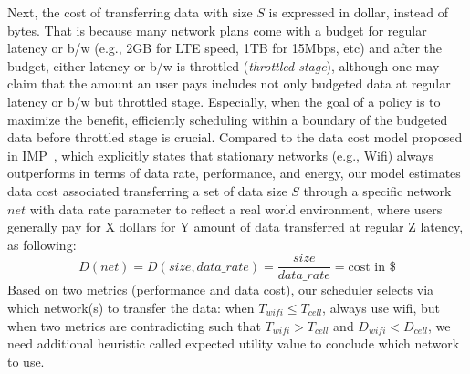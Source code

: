 \documentclass[12pt]{article}
\begin{document}
Next, the cost of transferring data with size $S$ is expressed in dollar,
instead of bytes. That is because many network plans come with a budget for
regular latency or b/w (e.g., 2GB for LTE speed, 1TB for 15Mbps, etc) and after
the budget, either latency or b/w is throttled ({\it throttled stage}), although
one may claim that the amount an user pays includes not only budgeted data at
regular latency or b/w but throttled stage.  Especially, when the goal of a
policy is to maximize the benefit, efficiently scheduling within a boundary of
the budgeted data before throttled stage is crucial.
Compared to the data cost model proposed in IMP~\cite{imp}, which explicitly
states that stationary networks (e.g., Wifi) always outperforms in terms of data
rate, performance, and energy, our model estimates data cost associated
transferring a set of data size $S$ through a specific network $net$ with data
rate parameter to reflect a real world environment, where users generally pay
for X dollars for Y amount of data transferred at regular Z latency, as
following:
$$D(net)=D(size, data\_rate) = \frac{size}{data\_rate} = \text{cost in }\$ $$
Based on two metrics (performance and data cost), our scheduler selects via
which network(s) to transfer the data: when $T_{wifi} \leq T_{cell}$, always use
wifi, but when two metrics are contradicting such that $T_{wifi} > T_{cell}$ and
$D_{wifi} < D_{cell}$, we need additional heuristic called expected utility
value to conclude which network to use.
\nw
\end{document}
